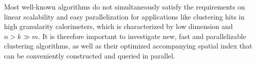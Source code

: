 Most well-known algorithms do not simultaneously satisfy the requirements on linear scalability and easy parallelization for applications like clustering hits in high granularity calorimeters, which is characterized by low dimension and $n > k \gg m$. It is therefore important to investigate new, fast and parallelizable clustering algorithms, as well as their optimized accompanying spatial index that can be conveniently constructed and queried in parallel.





